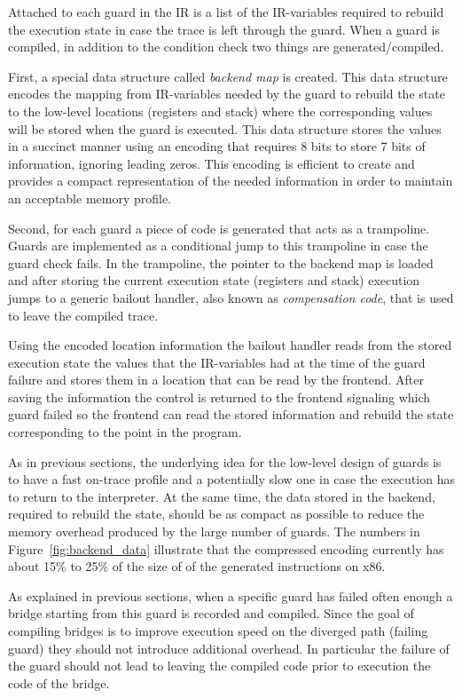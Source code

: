 \documentclass[10pt,preprint]{sigplanconf}
\begin{document}
Attached to each guard in the IR is a list of the IR-variables required to
rebuild the execution state in case the trace is left through
the guard. When a guard is compiled, in addition to the
condition check two things are generated/compiled.

First, a special data
structure called \emph{backend map} is created. This data structure encodes the
mapping from IR-variables needed by the guard to rebuild the state to the
low-level locations (registers and stack) where the corresponding values will
be stored when the guard is executed.
This data
structure stores the values in a succinct manner using an encoding that requires
8 bits to store 7 bits of information, ignoring leading zeros. This encoding is efficient to create and
provides a compact representation of the needed information in order
to maintain an acceptable memory profile.

Second, for each guard a piece of code is generated that acts as a trampoline.
Guards are implemented as a conditional jump to this trampoline in case the
guard check fails.
In the trampoline, the pointer to the
backend map is loaded and after storing the current execution state
(registers and stack) execution jumps to a generic bailout handler, also known
as \emph{compensation code},
that is used to leave the compiled trace.

Using the encoded location information the bailout handler reads from the
stored execution state the values that the IR-variables had at the time of the
guard failure and stores them in a location that can be read by the frontend.
After saving the information the control is returned to the frontend signaling
which guard failed so the frontend can read the stored information and rebuild
the state corresponding to the point in the program.

As in previous sections, the underlying idea for the low-level design of guards is to have
a fast on-trace profile and a potentially slow one in case
the execution has to return to the interpreter. At the same
time, the data stored in the backend, required to rebuild the state, should be as
compact as possible to reduce the memory overhead produced by the large number
of guards. The numbers in Figure~\ref{fig:backend_data} illustrate that the
compressed encoding currently has about 15\% to 25\% of the size of of the
generated instructions on x86.

As explained in previous sections, when a specific guard has failed often enough
a bridge starting from this guard is recorded and compiled.
Since the goal of compiling bridges is to improve execution speed on the
diverged path (failing guard) they should not introduce additional overhead.
In particular the failure of the guard should not lead
to leaving the compiled code prior to execution the code of the bridge.
\end{document}
